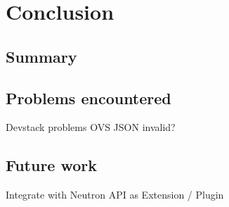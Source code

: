  \cleardoublepage
\chapter{Conclusion}

\section{Summary}

\section{Problems encountered}

Devstack problems
OVS JSON invalid?

\section{Future work}

Integrate with Neutron API as Extension / Plugin
